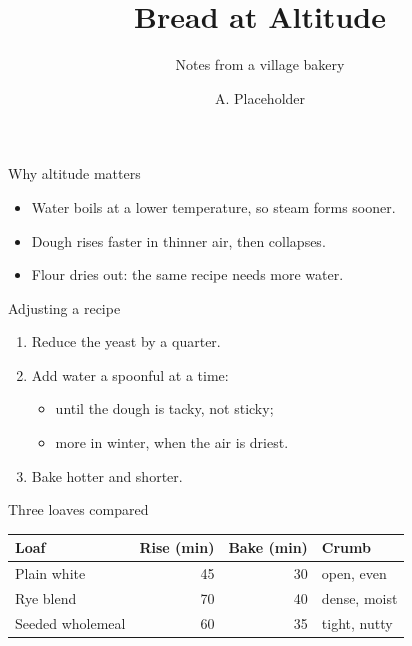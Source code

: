 \documentclass[aspectratio=169]{beamer}
\title{Bread at Altitude}
\subtitle{Notes from a village bakery}
\author{A. Placeholder}
\date{}
\begin{document}
\maketitle

\begin{frame}{Why altitude matters}
  \begin{itemize}
    \item<1-> Water boils at a lower temperature, so steam forms sooner.
    \item<2-> Dough rises faster in thinner air, then collapses.
    \item<3-> Flour dries out: the same recipe needs more water.
  \end{itemize}
\end{frame}

\begin{frame}{Adjusting a recipe}
  \begin{enumerate}
    \item Reduce the yeast by a quarter.
    \item Add water a spoonful at a time:
    \begin{itemize}
      \item until the dough is tacky, not sticky;
      \item more in winter, when the air is driest.
    \end{itemize}
    \item Bake hotter and shorter.
  \end{enumerate}
\end{frame}

\begin{frame}{Three loaves compared}
  \centering
  \begin{tabular}{@{}lrrl@{}}
    \toprule
    \textbf{Loaf} & \textbf{Rise (min)} & \textbf{Bake (min)} & \textbf{Crumb} \\
    \midrule
    Plain white & 45 & 30 & open, even \\
    Rye blend & 70 & 40 & dense, moist \\
    Seeded wholemeal & 60 & 35 & tight, nutty \\
    \bottomrule
  \end{tabular}
\end{frame}
\end{document}
